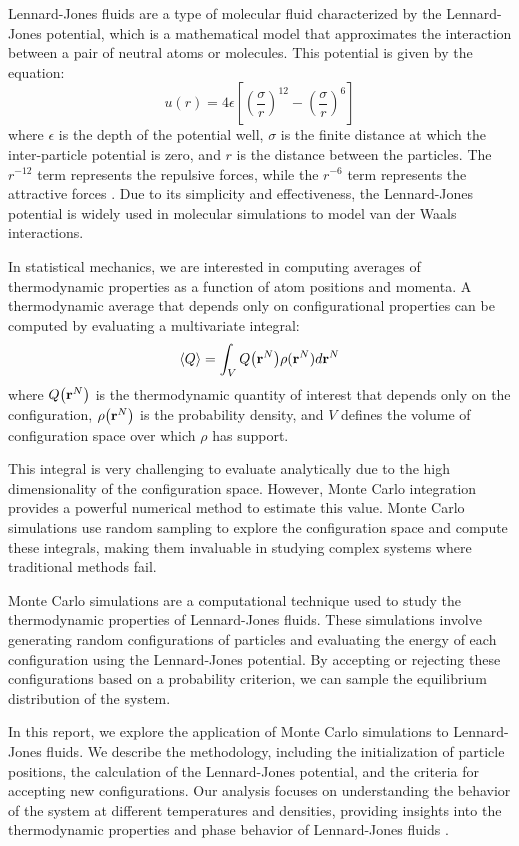 \documentclass[a4paper,12pt]{article}
\begin{document}
\begin{multicols}{2}
Lennard-Jones fluids are a type of molecular fluid characterized by the Lennard-Jones potential, which is a mathematical model that approximates the interaction between a pair of neutral atoms or molecules. This potential is given by the equation:
\begin{equation}
    u(r) = 4\epsilon \left[ \left( \frac{\sigma}{r} \right)^{12} - \left( \frac{\sigma}{r} \right)^{6} \right] 
\end{equation}
where \( \epsilon \) is the depth of the potential well, \( \sigma \) is the finite distance at which the inter-particle potential is zero, and \( r \) is the distance between the particles. The \( r^{-12} \) term represents the repulsive forces, while the \( r^{-6} \) term represents the attractive forces \cite{Viot2016}. Due to its simplicity and effectiveness, the Lennard-Jones potential is widely used in molecular simulations to model van der Waals interactions.

In statistical mechanics, we are interested in computing averages of thermodynamic properties as a function of atom positions and momenta. A thermodynamic average that depends only on configurational properties can be computed by evaluating a multivariate integral:
\begin{equation}
    \langle Q \rangle = \int_V Q\qty(\textbf{r}^N)\rho(\textbf{r}^N)d\textbf{r}^N
\end{equation}   
where \( Q\qty(\textbf{r}^N) \) is the thermodynamic quantity of interest that depends only on the configuration, \( \rho\qty( \textbf{r}^N) \) is the probability density, and \( V \) defines the volume of configuration space over which \( \rho \) has support. 

This integral is very challenging to evaluate analytically due to the high dimensionality of the configuration space. However, Monte Carlo integration provides a powerful numerical method to estimate this value. Monte Carlo simulations use random sampling to explore the configuration space and compute these integrals, making them invaluable in studying complex systems where traditional methods fail.

Monte Carlo simulations are a computational technique used to study the thermodynamic properties of Lennard-Jones fluids. These simulations involve generating random configurations of particles and evaluating the energy of each configuration using the Lennard-Jones potential. By accepting or rejecting these configurations based on a probability criterion, we can sample the equilibrium distribution of the system.

In this report, we explore the application of Monte Carlo simulations to Lennard-Jones fluids. We describe the methodology, including the initialization of particle positions, the calculation of the Lennard-Jones potential, and the criteria for accepting new configurations. Our analysis focuses on understanding the behavior of the system at different temperatures and densities, providing insights into the thermodynamic properties and phase behavior of Lennard-Jones fluids \citep{msse2022}.
\end{multicols}
 
\end{document}
